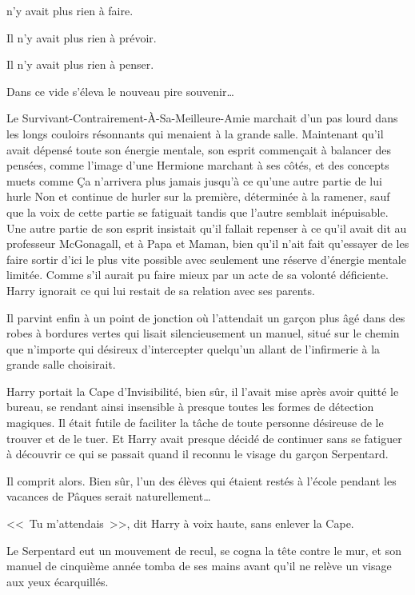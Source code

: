 
 n'y avait plus rien à faire.

\hplettrineextrapara
Il n'y avait plus rien à prévoir.

Il n'y avait plus rien à penser.

Dans ce vide s'éleva le nouveau pire souvenir…

Le Survivant-Contrairement-À-Sa-Meilleure-Amie marchait d'un pas lourd dans les longs couloirs résonnants qui menaient à la grande salle. Maintenant qu'il avait dépensé toute son énergie mentale, son esprit commençait à balancer des pensées, comme l'image d'une Hermione marchant à ses côtés, et des concepts muets comme Ça n'arrivera plus jamais jusqu'à ce qu'une autre partie de lui hurle Non et continue de hurler sur la première, déterminée à la ramener, sauf que la voix de cette partie se fatiguait tandis que l'autre semblait inépuisable. Une autre partie de son esprit insistait qu'il fallait repenser à ce qu'il avait dit au professeur McGonagall, et à Papa et Maman, bien qu'il n'ait fait qu'essayer de les faire sortir d'ici le plus vite possible avec seulement une réserve d'énergie mentale limitée. Comme s'il aurait pu faire mieux par un acte de sa volonté déficiente. Harry ignorait ce qui lui restait de sa relation avec ses parents.

Il parvint enfin à un point de jonction où l'attendait un garçon plus âgé dans des robes à bordures vertes qui lisait silencieusement un manuel, situé sur le chemin que n'importe qui désireux d'intercepter quelqu'un allant de l'infirmerie à la grande salle choisirait.

Harry portait la Cape d'Invisibilité, bien sûr, il l'avait mise après avoir quitté le bureau, se rendant ainsi insensible à presque toutes les formes de détection magiques. Il était futile de faciliter la tâche de toute personne désireuse de le trouver et de le tuer. Et Harry avait presque décidé de continuer sans se fatiguer à découvrir ce qui se passait quand il reconnu le visage du garçon Serpentard.

Il comprit alors. Bien sûr, l'un des élèves qui étaient restés à l'école pendant les vacances de Pâques serait naturellement…

<<~Tu m'attendais~>>, dit Harry à voix haute, sans enlever la Cape.

Le Serpentard eut un mouvement de recul, se cogna la tête contre le mur, et son manuel de cinquième année tomba de ses mains avant qu'il ne relève un visage aux yeux écarquillés.

